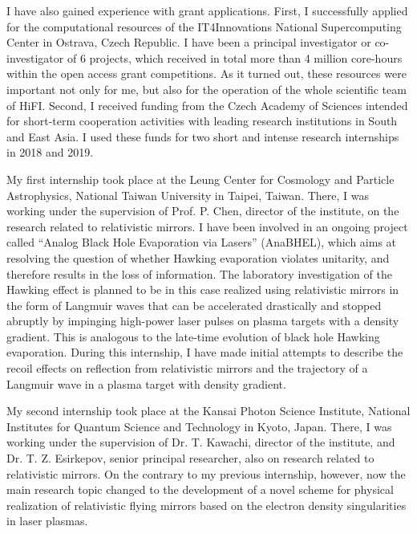 \documentclass[10pt, a4paper, twoside, openright]{report}
\newcommand{\q}[1]{``#1''} %
\begin{document}
I have also gained experience with grant applications. First, I successfully applied for the computational resources of the IT4Innovations National Supercomputing Center in Ostrava, Czech Republic. I have been a principal investigator or co-investigator of 6 projects, which received in total more than 4 million core-hours within the open access grant competitions. As it turned out, these resources were important not only for me, but also for the operation of the whole scientific team of HiFI. Second, I received funding from the Czech Academy of Sciences intended for short-term cooperation activities with leading research institutions in South and East Asia. I used these funds for two short and intense research internships in 2018 and 2019. 

My first internship took place at the Leung Center for Cosmology and Particle Astrophysics, National Taiwan University in Taipei, Taiwan. There, I was working under the supervision of Prof. P. Chen, director of the institute, on the research related to relativistic mirrors. I have been involved in an ongoing project called \q{Analog Black Hole Evaporation via Lasers} (AnaBHEL), which aims at resolving the question of whether Hawking evaporation violates unitarity, and therefore results in the loss of information. The laboratory investigation of the Hawking effect is planned to be in this case realized using relativistic mirrors in the form of Langmuir waves that can be accelerated drastically and stopped abruptly by impinging high-power laser pulses on plasma targets with a density gradient. This is analogous to the late-time evolution of black hole Hawking evaporation. During this internship, I have made initial attempts to describe the recoil effects on reflection from relativistic mirrors and the trajectory of a Langmuir wave in a plasma target with density gradient.

My second internship took place at the Kansai Photon Science Institute, National Institutes for Quantum Science and Technology in Kyoto, Japan. There, I was working under the supervision of Dr. T. Kawachi, director of the institute, and Dr. T. Z. Esirkepov, senior principal researcher, also on research related to relativistic mirrors. On the contrary to my previous internship, however, now the main research topic changed to the development of a novel scheme for physical realization of relativistic flying mirrors based on the electron density singularities in laser plasmas. 
\end{document}
